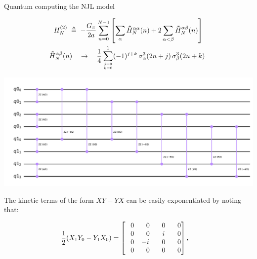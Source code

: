 \begin{frame}[allowframebreaks]{Quantum computing the NJL model}
\begin{minipage}[c]{\linewidth}
\begin{multicols}{2}
  \end{multicols}\end{minipage}

\break\break

  \begin{minipage}[c]{\linewidth}
  \begin{gather*}
    H_{N}^{(2)} \;\defeq\; - \frac{G_{\pi}}{2a} \sum_{n=0}^{N-1} \qty[
      \sum_{\alpha} \dbtilde{H}_{N}^{\alpha\alpha}(n) + 2
      \sum_{\alpha < \beta} \dbtilde{H}_{N}^{\alpha\beta}(n)] \\
    \dbtilde{H}_{N}^{\alpha\beta}(n) \qra
    \frac{1}{4} \sum_{{j=0}\atop{k=0}}^{1}
    (-1)^{j+k} \, \sigma_\alpha^{3}(2n+j) \, \sigma_\beta^{3}(2n+k) \
  \end{gather*}
  \vspace{-2em}
  \begin{center}
    \includegraphics[width=.60\paperwidth]{Figures/chapter06/H2-rotation}
  \end{center}
  \vspace{-2em}
\end{minipage}


\break

  The kinetic terms of the form $XY-YX$ can be easily exponentiated by noting that:

  \begin{multicols}{2}

    \begin{gather*}
      \frac{1}{2}(X_1Y_0 - Y_1X_0) =
      \mqty[\phpl 0 & \phpl 0 & \phpl 0 & \phpl 0 \\
            \phpl 0 & \phpl 0 & \phpl i & \phpl 0 \\
            \phpl 0 &      -i & \phpl 0 & \phpl 0 \\
            \phpl 0 & \phpl 0 & \phpl 0 & \phpl 0   ] \qc
    \end{gather*}


\end{multicols}
\end{frame}
